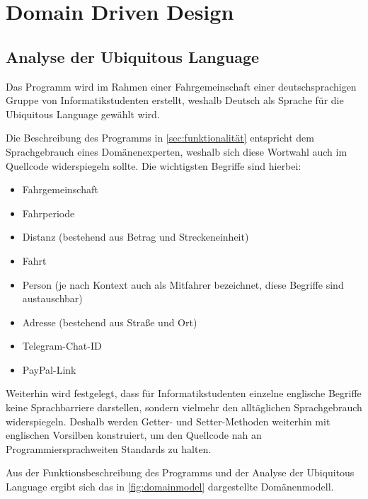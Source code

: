 \chapter{Domain Driven Design}
\section{Analyse der Ubiquitous Language}
Das Programm wird im Rahmen einer Fahrgemeinschaft einer deutschsprachigen Gruppe von Informatikstudenten erstellt, weshalb Deutsch als Sprache für die Ubiquitous Language gewählt wird.

Die Beschreibung des Programms in \autoref{sec:funktionalität} entspricht dem Sprachgebrauch eines Domänenexperten, weshalb sich diese Wortwahl auch im Quellcode widerspiegeln sollte.
Die wichtigsten Begriffe sind hierbei:

\begin{itemize}
    \item Fahrgemeinschaft
    \item Fahrperiode
    \item Distanz (bestehend aus Betrag und Streckeneinheit)
    \item Fahrt
    \item Person (je nach Kontext auch als Mitfahrer bezeichnet, diese Begriffe sind austauschbar)
    \item Adresse (bestehend aus Straße und Ort)
    \item Telegram-Chat-ID
    \item PayPal-Link
\end{itemize}

Weiterhin wird festgelegt, dass für Informatikstudenten einzelne englische Begriffe keine Sprachbarriere darstellen, sondern vielmehr den alltäglichen Sprachgebrauch widerspiegeln.
Deshalb werden Getter- und Setter-Methoden weiterhin mit englischen Vorsilben konstruiert, um den Quellcode nah an Programmiersprachweiten Standards zu halten.

Aus der Funktionsbeschreibung des Programms und der Analyse der Ubiquitous Language ergibt sich das in \autoref{fig:domainmodel} dargestellte Domänenmodell.

